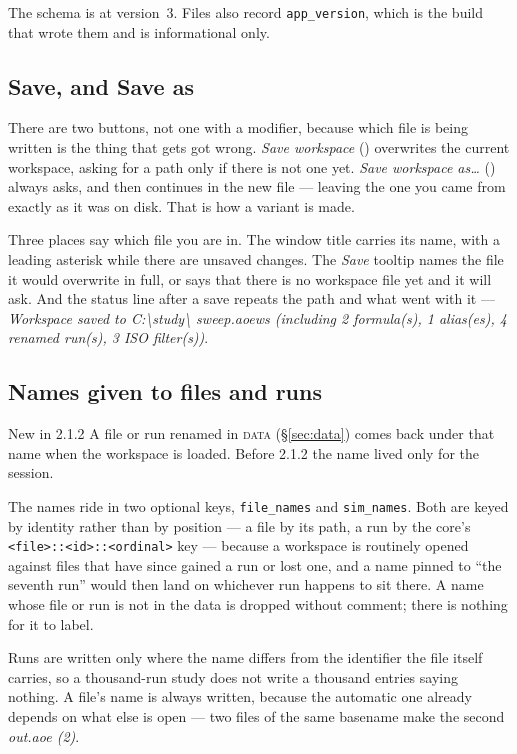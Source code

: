 \documentclass[11pt,a4paper,oneside]{report}
\newcommand{\appver}{2.1.2}
\newcommand{\code}[1]{\texttt{#1}}
\newcommand{\key}[1]{\textsf{\small\fbox{#1}}}
\newcommand{\tab}[1]{\textsc{#1}}
\begin{document}
The schema is at version~3. Files also record \code{app\_version}, which is the
build that wrote them and is informational only.

\subsection{Save, and Save as}

There are two buttons, not one with a modifier, because which file is being
written is the thing that gets got wrong. \emph{Save workspace} (\key{Ctrl+S})
overwrites the current workspace, asking for a path only if there is not one yet.
\emph{Save workspace as\ldots} (\key{Ctrl+Shift+S}) always asks, and then
continues in the new file --- leaving the one you came from exactly as it was on
disk. That is how a variant is made.

Three places say which file you are in. The window title carries its name, with a
leading asterisk while there are unsaved changes. The \emph{Save} tooltip names
the file it would overwrite in full, or says that there is no workspace file yet
and it will ask. And the status line after a save repeats the path and what went
with it --- \emph{Workspace saved to C:\textbackslash study\textbackslash
sweep.aoews (including 2 formula(s), 1 alias(es), 4 renamed run(s), 3 ISO
filter(s))}.

\subsection{Names given to files and runs}

\begin{aoenew}{New in \appver}
A file or run renamed in \tab{data} (\S\ref{sec:data}) comes back under that name
when the workspace is loaded. Before \appver{} the name lived only for the
session.
\end{aoenew}

The names ride in two optional keys, \code{file\_names} and \code{sim\_names}.
Both are keyed by identity rather than by position --- a file by its path, a run
by the core's \code{<file>::<id>::<ordinal>} key --- because a workspace is
routinely opened against files that have since gained a run or lost one, and a
name pinned to ``the seventh run'' would then land on whichever run happens to sit
there. A name whose file or run is not in the data is dropped without comment;
there is nothing for it to label.

Runs are written only where the name differs from the identifier the file itself
carries, so a thousand-run study does not write a thousand entries saying
nothing. A file's name is always written, because the automatic one already
depends on what else is open --- two files of the same basename make the second
\emph{out.aoe (2)}.
\end{document}
